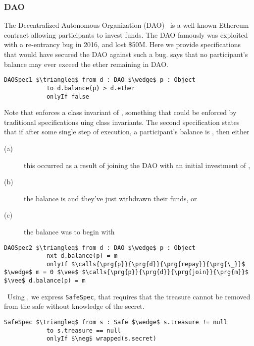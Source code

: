 \subsubsection{DAO}
The Decentralized Autonomous Organization (DAO)~\cite{Dao}  is a well-known Ethereum contract allowing 
participants to invest funds. The DAO famously was exploited with a re-entrancy bug in 2016, 
and lost \$50M. Here we provide specifications that would have secured the DAO against such a 
bug.  says that no participant's balance may ever exceed the ether remaining 
in DAO.
\begin{lstlisting}[language = Chainmail, mathescape=true, frame=lines]
DAOSpec1 $\triangleq$ from d : DAO $\wedge$ p : Object
            to d.balance(p) > d.ether
            onlyIf false
\end{lstlisting}
Note that  enforces a class invariant of , something that could be enforced
by traditional specifications uing class invariants.
The second specification  states that if after some single step of execution, a participant's balance is , then 
either 
\begin{description}
\item[(a)] this occurred as a result of joining the DAO with an initial investment of , 
\item[(b)] the balance is  and they've just withdrawn their funds, or 
\item[(c) ]the balance was  to begin with
\end{description}
\begin{lstlisting}[language = Chainmail, mathescape=true, frame=lines]
DAOSpec2 $\triangleq$ from d : DAO $\wedge$ p : Object
            nxt d.balance(p) = m
            onlyIf $\calls{\prg{p}}{\prg{d}}{\prg{repay}}{\prg{\_}}$ $\wedge$ m = 0 $\vee$ $\calls{\prg{p}}{\prg{d}}{\prg{join}}{\prg{m}}$ $\vee$ d.balance(p) = m
\end{lstlisting}

\ Using \Nec, we express \texttt{SafeSpec}, that requires that the treasure cannot be 
removed from the safe without knowledge of the secret.
\begin{lstlisting}[language = Chainmail, mathescape=true, frame=lines]
SafeSpec $\triangleq$ from s : Safe $\wedge$ s.treasure != null
            to s.treasure == null
            onlyIf $\neg$ wrapped(s.secret)
\end{lstlisting}

